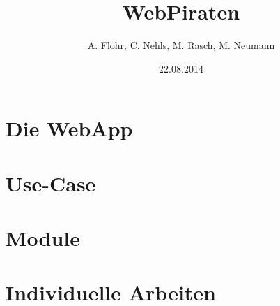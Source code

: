 \documentclass{beamer}
\begin{document}

\title{WebPiraten}  
\author{A. Flohr, C. Nehls, M. Rasch,  M. Neumann}
\date{22.08.2014} 

\begin{frame}
\maketitle
\end{frame} 



\section{Die WebApp}

\section{Use-Case}

\section{Module}





\section{Individuelle Arbeiten}





\end{document}
